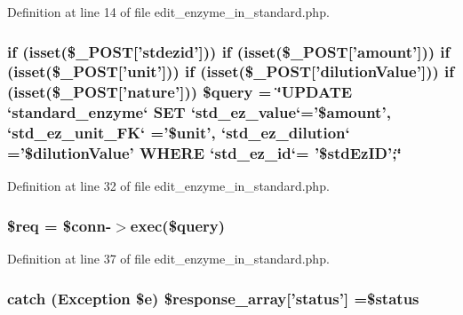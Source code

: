 Definition at line 14 of file edit\-\_\-enzyme\-\_\-in\-\_\-standard.\-php.

\hypertarget{edit__enzyme__in__standard_8php_a5e1ed82c80f5fde645e49c881fe6b64f}{
\subsubsection[{\$query}]{\setlength{\rightskip}{0pt plus 5cm}if (isset(\$\-\_\-\-P\-O\-S\-T\mbox{[}'stdezid'\mbox{]})) if (isset(\$\-\_\-\-P\-O\-S\-T\mbox{[}'amount'\mbox{]})) if (isset(\$\-\_\-\-P\-O\-S\-T\mbox{[}'unit'\mbox{]})) if (isset(\$\-\_\-\-P\-O\-S\-T\mbox{[}'dilution\-Value'\mbox{]})) if (isset(\$\-\_\-\-P\-O\-S\-T\mbox{[}'nature'\mbox{]})) \$query = \char`\"{}U\-P\-D\-A\-T\-E `standard\-\_\-enzyme` S\-E\-T `std\-\_\-ez\-\_\-value`='\$amount', `std\-\_\-ez\-\_\-unit\-\_\-\-F\-K` ='\$unit', `std\-\_\-ez\-\_\-dilution` ='\$dilution\-Value' W\-H\-E\-R\-E `std\-\_\-ez\-\_\-id`= '\$std\-Ez\-I\-D';\char`\"{}}}\label{edit__enzyme__in__standard_8php_a5e1ed82c80f5fde645e49c881fe6b64f}


Definition at line 32 of file edit\-\_\-enzyme\-\_\-in\-\_\-standard.\-php.

\hypertarget{edit__enzyme__in__standard_8php_a63a7a283ea5dee8af1e2d5a3435bf370}{
\subsubsection[{\$req}]{\setlength{\rightskip}{0pt plus 5cm}\$req = \$conn-\/$>$exec(\$query)}}\label{edit__enzyme__in__standard_8php_a63a7a283ea5dee8af1e2d5a3435bf370}


Definition at line 37 of file edit\-\_\-enzyme\-\_\-in\-\_\-standard.\-php.

\hypertarget{edit__enzyme__in__standard_8php_a8452fb8131316637a04e25f5fde066d9}{
\subsubsection[{\$response\-\_\-array}]{\setlength{\rightskip}{0pt plus 5cm}catch (Exception \$e) \$response\-\_\-array\mbox{[}'status'\mbox{]} =\$status}}\label{edit__enzyme__in__standard_8php_a8452fb8131316637a04e25f5fde066d9}


